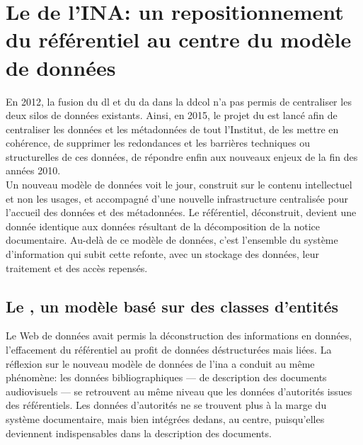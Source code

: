 \section{\label{III-B-2}Le \ldd de l'INA: un repositionnement du référentiel au centre du modèle de données}

 En 2012, la fusion du \ac{dl} et du \ac{da} dans la \ac{ddcol} n'a pas permis de centraliser les deux silos de données existants. Ainsi, en 2015, le projet du \ldd est lancé afin de centraliser les données et les métadonnées de tout l'Institut, de les mettre en cohérence, de supprimer les redondances et les barrières techniques ou structurelles de ces données, de répondre enfin aux nouveaux enjeux de la fin des années 2010.\\

Un nouveau modèle de données voit le jour, construit sur le contenu intellectuel et non les usages, et accompagné d'une nouvelle infrastructure centralisée pour l'accueil des données et des métadonnées. Le référentiel, déconstruit, devient une donnée identique aux données résultant de la décomposition de la notice documentaire. Au-delà de ce modèle de données, c'est l'ensemble du système d'information qui subit cette refonte, avec un stockage des données, leur traitement et des accès repensés.

\subsection{\label{III-B-2-a}Le \ldd, un modèle basé sur des classes d'entités}

Le Web de données avait permis la déconstruction des informations en données, l'effacement du référentiel au profit de données déstructurées mais liées. La réflexion sur le nouveau modèle de données de l'\ac{ina} a conduit au même phénomène: les données bibliographiques --- de description des documents audiovisuels --- se retrouvent au même niveau que les données d'autorités issues des référentiels. Les données d'autorités ne se trouvent plus à la marge du système documentaire, mais bien intégrées dedans, au centre, puisqu'elles deviennent indispensables dans la description des documents.\\

